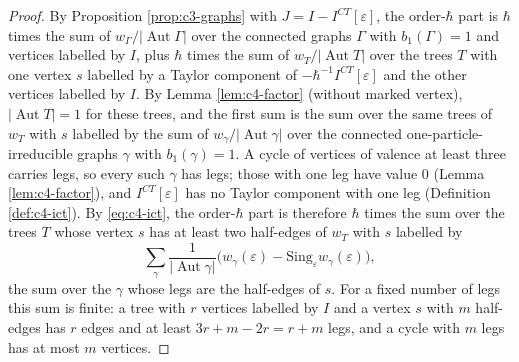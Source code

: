 \begin{proof}
By Proposition \ref{prop:c3-graphs} with $J=I-I^{CT}[\varepsilon]$, the order-$\hbar$ part is $\hbar$ times the sum of $w_\Gamma/|\operatorname{Aut}\Gamma|$ over the connected graphs $\Gamma$ with $b_1(\Gamma)=1$ and vertices labelled by $I$, plus $\hbar$ times the sum of $w_T/|\operatorname{Aut}T|$ over the trees $T$ with one vertex $s$ labelled by a Taylor component of $-\hbar^{-1}I^{CT}[\varepsilon]$ and the other vertices labelled by $I$. By Lemma \ref{lem:c4-factor} (without marked vertex), $|\operatorname{Aut}T|=1$ for these trees, and the first sum is the sum over the same trees of $w_T$ with $s$ labelled by the sum of $w_\gamma/|\operatorname{Aut}\gamma|$ over the connected one-particle-irreducible graphs $\gamma$ with $b_1(\gamma)=1$. A cycle of vertices of valence at least three carries legs, so every such $\gamma$ has legs; those with one leg have value $0$ (Lemma \ref{lem:c4-factor}), and $I^{CT}[\varepsilon]$ has no Taylor component with one leg (Definition \ref{def:c4-ict}). By \eqref{eq:c4-ict}, the order-$\hbar$ part is therefore $\hbar$ times the sum over the trees $T$ whose vertex $s$ has at least two half-edges of $w_T$ with $s$ labelled by
\[
\sum_\gamma\frac{1}{|\operatorname{Aut}\gamma|}\Big(w_\gamma(\varepsilon)-\mathrm{Sing}_\varepsilon w_\gamma(\varepsilon)\Big),
\]
the sum over the $\gamma$ whose legs are the half-edges of $s$. For a fixed number of legs this sum is finite: a tree with $r$ vertices labelled by $I$ and a vertex $s$ with $m$ half-edges has $r$ edges and at least $3r+m-2r=r+m$ legs, and a cycle with $m$ legs has at most $m$ vertices.


\end{proof}
